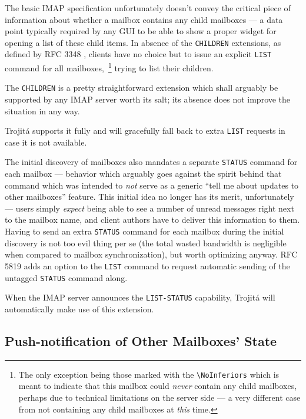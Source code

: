 \documentclass[trojita]{subfiles}
\begin{document}
The basic IMAP specification unfortunately doesn't convey the critical piece of information about whether a mailbox
contains any child mailboxes --- a data point typically required by any GUI to be able to show a proper widget for
opening a list of these child items.  In absence of the {\tt CHILDREN} extensions, as defined by RFC 3348
\cite{rfc3348}, clients have no choice but to issue an explicit {\tt LIST} command for all mailboxes,~\footnote{The only
exception being those marked with the {\tt {\textbackslash}NoInferiors} which is meant to indicate that this mailbox
could {\em never} contain any child mailboxes, perhaps due to technical limitations on the server side --- a very
different case from not containing any child mailboxes at {\em this} time.} trying to list their children.

The {\tt CHILDREN} is a pretty straightforward extension which shall arguably be supported by any IMAP server worth its
salt; its absence does not improve the situation in any way.

\begin{trojitabehavior}
Trojitá supports it fully and will gracefully fall back to extra {\tt LIST} requests in case it is not available.
\end{trojitabehavior}

The initial discovery of mailboxes also mandates a separate {\tt STATUS} command for each mailbox --- behavior which
arguably goes against the spirit behind that command which was intended to {\em not} serve as a generic ``tell me about
updates to other mailboxes'' feature.  This initial idea no longer has its merit, unfortunately --- users simply {\em
expect} being able to see a number of unread messages right next to the mailbox name, and client authors have to deliver
this information to them.  Having to send an extra {\tt STATUS} command for each mailbox during the initial discovery is
not too evil thing per se (the total wasted bandwidth is negligible when compared to mailbox synchronization), but worth
optimizing anyway.  RFC 5819 \cite{rfc5819} adds an option to the {\tt LIST} command to request automatic sending of the
untagged {\tt STATUS} command along.

\begin{trojitabehavior}
When the IMAP server announces the {\tt LIST-STATUS} capability, Trojitá will automatically make use of this extension.
\end{trojitabehavior}

\subsection{Push-notification of Other Mailboxes' State}
\end{document}
